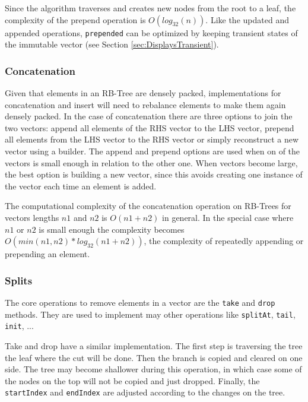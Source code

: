Since the algorithm traverses and creates new nodes from the root to a leaf, the complexity of the prepend operation is $O(log_{32}(n))$. Like the updated and appended operations, \texttt{prepended} can be optimized by keeping transient states of the immutable vector (see Section \ref{sec:DisplaysTransient}).


\subsubsection{Concatenation}
Given that elements in an RB-Tree are densely packed, implementations for concatenation and insert will need to rebalance elements to make them again densely packed. In the case of concatenation there are three options to join the two vectors: append all elements of the RHS vector to the LHS vector, prepend all elements from the LHS vector to the RHS vector or simply reconstruct a new vector using a builder. The append and prepend options are used when on of the vectors is small enough in relation to the other one. When vectors become large, the best option is building a new vector, since this avoids creating one instance of the vector each time an element is added.

The computational complexity of the concatenation operation on RB-Trees for vectors lengths $n1$ and $n2$ is $O(n1 + n2)$ in general. In the special case where $n1$ or $n2$ is small enough the complexity becomes $O(min(n1,n2)*log_{32}(n1+n2))$, the complexity of repeatedly appending or prepending an element.

\subsubsection{Splits}
The core operations to remove elements in a vector are the \texttt{take} and \texttt{drop} methods. They are used to implement may other operations like \texttt{splitAt}, \texttt{tail}, \texttt{init}, ...

Take and drop have a similar implementation. The first step is traversing the tree the leaf where the cut will be done. Then the branch is copied and cleared on one side. The tree may become shallower during this operation, in which case some of the nodes on the top will not be copied and just dropped. Finally, the \texttt{startIndex} and \texttt{endIndex} are adjusted according to the changes on the tree.

